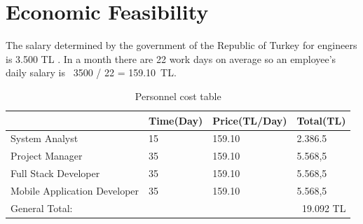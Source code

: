 \newpage
\section{Economic Feasibility}
The salary determined by the government of the Republic of Turkey for engineers
is 3.500 TL \cite{muhendisMaas}. In a month there are 22 work days on average so an employee's daily salary is \ 3500 / 22 = 159.10\ TL.

\begin{table}[!h!]
\centering
\caption{Personnel cost table}
\label{tab:maas}
\begin{tabular}{|l|l|l|l|}
\hline
& \multicolumn{1}{l|}{\textbf{Time(Day)}} & \multicolumn{1}{l|}{\textbf{Price(TL/Day)}} & \multicolumn{1}{l|}{\textbf{Total(TL)}} \\ \hline
System Analyst   & 15                                      & 159.10                                      & 2.386.5                                 \\ \hline
Project Manager      & 35                                      & 159.10                                      & 5.568,5                                 \\ \hline
Full Stack Developer     & 35                                      & 159.10                                      & 5.568,5                                 \\ \hline
Mobile Application Developer & 35                                       & 159.10                                      & 5.568,5                                  \\ \hline
General Total:      & \multicolumn{3}{r|}{19.092 TL}                                                                                                  \\ \hline
\end{tabular}
\end{table}

